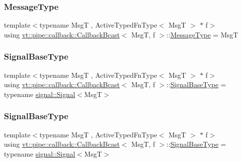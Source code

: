 \subsubsection{\texorpdfstring{Message\+Type}{MessageType}\hspace{0.1cm}{\footnotesize\ttfamily [2/2]}}
{\footnotesize\ttfamily template$<$typename MsgT , Active\+Typed\+Fn\+Type$<$ Msg\+T $>$ $\ast$ f$>$ \\
using \hyperlink{structvt_1_1pipe_1_1callback_1_1_callback_bcast}{vt\+::pipe\+::callback\+::\+Callback\+Bcast}$<$ MsgT, f $>$\+::\hyperlink{structvt_1_1pipe_1_1callback_1_1_callback_bcast_a71dc6da3c022c5fe989265da28bedec6}{Message\+Type} =  MsgT}

\mbox{\label{structvt_1_1pipe_1_1callback_1_1_callback_bcast_a25891ab2b71bd3b3883df52172412607}} 
\subsubsection{\texorpdfstring{Signal\+Base\+Type}{SignalBaseType}\hspace{0.1cm}{\footnotesize\ttfamily [1/2]}}
{\footnotesize\ttfamily template$<$typename MsgT , Active\+Typed\+Fn\+Type$<$ Msg\+T $>$ $\ast$ f$>$ \\
using \hyperlink{structvt_1_1pipe_1_1callback_1_1_callback_bcast}{vt\+::pipe\+::callback\+::\+Callback\+Bcast}$<$ MsgT, f $>$\+::\hyperlink{structvt_1_1pipe_1_1callback_1_1_callback_bcast_a25891ab2b71bd3b3883df52172412607}{Signal\+Base\+Type} =  typename \hyperlink{structvt_1_1pipe_1_1signal_1_1_signal}{signal\+::\+Signal}$<$MsgT$>$}

\mbox{\label{structvt_1_1pipe_1_1callback_1_1_callback_bcast_a25891ab2b71bd3b3883df52172412607}} 
\subsubsection{\texorpdfstring{Signal\+Base\+Type}{SignalBaseType}\hspace{0.1cm}{\footnotesize\ttfamily [2/2]}}
{\footnotesize\ttfamily template$<$typename MsgT , Active\+Typed\+Fn\+Type$<$ Msg\+T $>$ $\ast$ f$>$ \\
using \hyperlink{structvt_1_1pipe_1_1callback_1_1_callback_bcast}{vt\+::pipe\+::callback\+::\+Callback\+Bcast}$<$ MsgT, f $>$\+::\hyperlink{structvt_1_1pipe_1_1callback_1_1_callback_bcast_a25891ab2b71bd3b3883df52172412607}{Signal\+Base\+Type} =  typename \hyperlink{structvt_1_1pipe_1_1signal_1_1_signal}{signal\+::\+Signal}$<$MsgT$>$}

